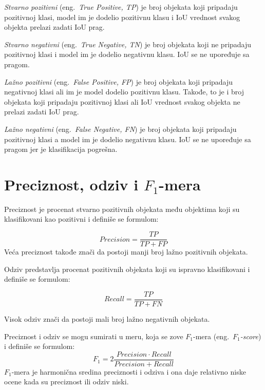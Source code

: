 \documentclass[12pt,oneside]{memoir}
\begin{document}
\textit{Stvarno pozitivni} (eng.~\textit{True Positive, TP}) je broj objekata koji pripadaju pozitivnoj klasi, model im je dodelio pozitivnu klasu i IoU vrednost svakog objekta prelazi zadati IoU prag.

\textit{Stvarno negativni} (eng.~\textit{True Negative, TN}) je broj objekata koji ne pripadaju pozitivnoj klasi i model im je dodelio negativnu klasu. IoU se ne upoređuje sa pragom.

\textit{Lažno pozitivni} (eng.~\textit{False Positive, FP}) je broj objekata koji pripadaju negativnoj klasi ali im je model dodelio pozitivnu klasu. Takođe, to je i broj objekata koji pripadaju pozitivnoj klasi ali IoU vrednost svakog objekta ne prelazi zadati IoU prag.

\textit{Lažno negativni} (eng.~\textit{False Negative, FN}) je broj objekata koji pripadaju pozitivnoj klasi a model im je dodelio negativnu klasu. IoU se ne upoređuje sa pragom jer je klasifikacija pogrešna. 

\section{Preciznost, odziv i \texorpdfstring{$F_1$}{TEXT}-mera}
Preciznost je procenat stvarno pozitivnih objekata među objektima koji su klasifikovani kao pozitivni i definiše se formulom:

\begin{equation}
    Precision = \frac{TP}{TP+FP}
\end{equation}
Veća preciznost takođe znači da postoji manji broj lažno pozitivnih objekata.

Odziv predstavlja procenat pozitivnih objekata koji su ispravno klasifikovani i definiše se formulom:

\begin{equation}
    Recall = \frac{TP}{TP+FN}
\end{equation}

Visok odziv znači da postoji mali broj lažno negativnih objekata.

Preciznost i odziv se mogu sumirati u meru, koja se zove $F_1$-mera (eng.~\textit{$F_1$-score}) \cite{sasaki2007truth} i definiše se formulom:
\begin{equation}
\label{eq:f1}
    F_1 = 2\frac{Precision \cdot Recall}{Precision+Recall}
\end{equation}
$F_1$-mera je harmonična sredina preciznosti i odziva i ona daje relativno niske ocene kada su preciznost ili odziv niski. 
\end{document}
